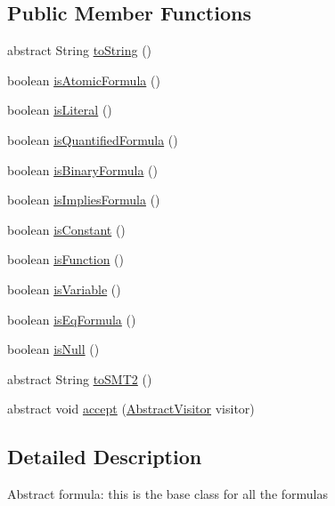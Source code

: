 \subsection*{Public Member Functions}
\begin{DoxyCompactItemize}
\item 
abstract String \hyperlink{classuran_1_1formula_1_1_abstract_formula_a5282c2da0e6e60f04a9ec12dc464ad92}{to\+String} ()
\item 
boolean \hyperlink{classuran_1_1formula_1_1_abstract_formula_aa65d81149375ac14b5f41f0e50d958d2}{is\+Atomic\+Formula} ()
\item 
boolean \hyperlink{classuran_1_1formula_1_1_abstract_formula_aaa4108f7c1f2df24226c983427393489}{is\+Literal} ()
\item 
boolean \hyperlink{classuran_1_1formula_1_1_abstract_formula_aa3eba3be20ee0147c012ba714def29a1}{is\+Quantified\+Formula} ()
\item 
boolean \hyperlink{classuran_1_1formula_1_1_abstract_formula_a4106323335837eddb318a9c788267c68}{is\+Binary\+Formula} ()
\item 
boolean \hyperlink{classuran_1_1formula_1_1_abstract_formula_a0dc398cdff34b194567a6cb1f23e5ec2}{is\+Implies\+Formula} ()
\item 
boolean \hyperlink{classuran_1_1formula_1_1_abstract_formula_aa10fdb82bc02be16f40d749cae3b1512}{is\+Constant} ()
\item 
boolean \hyperlink{classuran_1_1formula_1_1_abstract_formula_a207a1c88a41f76f87b0dcd18a8b05110}{is\+Function} ()
\item 
boolean \hyperlink{classuran_1_1formula_1_1_abstract_formula_ad60eae4880be8f48567b7bc46e262ad5}{is\+Variable} ()
\item 
boolean \hyperlink{classuran_1_1formula_1_1_abstract_formula_ac9be0d562a154e71a1434a8778f32c90}{is\+Eq\+Formula} ()
\item 
boolean \hyperlink{classuran_1_1formula_1_1_abstract_formula_acf5976057fd55c46099706490e63f1a1}{is\+Null} ()
\item 
abstract String \hyperlink{classuran_1_1formula_1_1_abstract_formula_ac604617b889c941a8c7ef2f4afa47490}{to\+S\+M\+T2} ()
\item 
abstract void \hyperlink{classuran_1_1formula_1_1_abstract_formula_ac8fa336f6b92b478d83ec74668179da0}{accept} (\hyperlink{classuran_1_1formula_1_1visitor_1_1_abstract_visitor}{Abstract\+Visitor} visitor)
\end{DoxyCompactItemize}


\subsection{Detailed Description}
Abstract formula\+: this is the base class for all the formulas 

